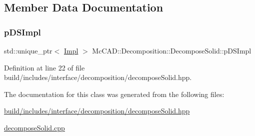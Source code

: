 \subsection{Member Data Documentation}
\mbox{\label{classMcCAD_1_1Decomposition_1_1DecomposeSolid_a7f822ce5590860062e38dca471847bcc}} 
\subsubsection{\texorpdfstring{p\+D\+S\+Impl}{pDSImpl}}
{\footnotesize\ttfamily std\+::unique\+\_\+ptr$<$ \hyperlink{classMcCAD_1_1Decomposition_1_1DecomposeSolid_1_1Impl}{Impl} $>$ Mc\+C\+A\+D\+::\+Decomposition\+::\+Decompose\+Solid\+::p\+D\+S\+Impl\hspace{0.3cm}{\ttfamily [private]}}



Definition at line 22 of file build/includes/interface/decomposition/decompose\+Solid.\+hpp.



The documentation for this class was generated from the following files\+:\begin{DoxyCompactItemize}
\item 
\hyperlink{build_2includes_2interface_2decomposition_2decomposeSolid_8hpp}{build/includes/interface/decomposition/decompose\+Solid.\+hpp}\item 
\hyperlink{decomposeSolid_8cpp}{decompose\+Solid.\+cpp}\end{DoxyCompactItemize}
